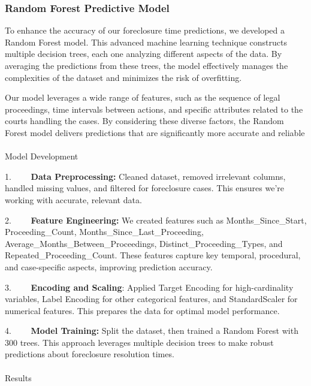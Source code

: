 \documentclass[
  letterpaper,
  DIV=11,
  numbers=noendperiod]{scrartcl}
\makeatletter
\let\oldparagraph\paragraph
\renewcommand{\paragraph}{
    \@ifstar
      \xxxParagraphStar
      \xxxParagraphNoStar
  }
\newcommand{\xxxParagraphStar}[1]{\oldparagraph*{#1}\mbox{}}
\newcommand{\xxxParagraphNoStar}[1]{\oldparagraph{#1}\mbox{}}
\makeatother
\begin{document}
\subsubsection{Random Forest Predictive Model}\label{sec-random-forest}

To enhance the accuracy of our foreclosure time predictions, we
developed a Random Forest model. This advanced machine learning
technique constructs multiple decision trees, each one analyzing
different aspects of the data. By averaging the predictions from these
trees, the model effectively manages the complexities of the dataset and
minimizes the risk of overfitting.

Our model leverages a wide range of features, such as the sequence of
legal proceedings, time intervals between actions, and specific
attributes related to the courts handling the cases. By considering
these diverse factors, the Random Forest model delivers predictions that
are significantly more accurate and reliable

\paragraph{Model Development}\label{model-development}

1.~~~~ \textbf{Data Preprocessing:} Cleaned dataset, removed irrelevant
columns, handled missing values, and filtered for foreclosure cases.
This ensures we're working with accurate, relevant data.

2.~~~~ \textbf{Feature Engineering:} We created features such as
Months\_Since\_Start, Proceeding\_Count,
Months\_Since\_Last\_Proceeding, Average\_Months\_Between\_Proceedings,
Distinct\_Proceeding\_Types, and Repeated\_Proceeding\_Count. These
features capture key temporal, procedural, and case-specific aspects,
improving prediction accuracy.

3.~~~~ \textbf{Encoding and Scaling}: Applied Target Encoding for
high-cardinality variables, Label Encoding for other categorical
features, and StandardScaler for numerical features. This prepares the
data for optimal model performance.

4.~~~~ \textbf{Model Training:} Split the dataset, then trained a Random
Forest with 300 trees. This approach leverages multiple decision trees
to make robust predictions about foreclosure resolution times.

\paragraph{Results}\label{results}
\end{document}
